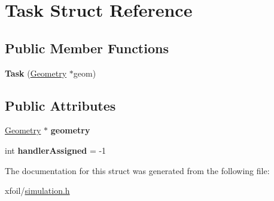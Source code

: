 \hypertarget{struct_task}{}\section{Task Struct Reference}
\label{struct_task}
\subsection*{Public Member Functions}
\begin{DoxyCompactItemize}
\item 
\hypertarget{struct_task_a065fcc943559671cefeb383652bc30fd}{}\label{struct_task_a065fcc943559671cefeb383652bc30fd} 
{\bfseries Task} (\hyperlink{class_geometry}{Geometry} $\ast$geom)
\end{DoxyCompactItemize}
\subsection*{Public Attributes}
\begin{DoxyCompactItemize}
\item 
\hypertarget{struct_task_a76af73b7a72c92cfc7ca31c88783f7df}{}\label{struct_task_a76af73b7a72c92cfc7ca31c88783f7df} 
\hyperlink{class_geometry}{Geometry} $\ast$ {\bfseries geometry}
\item 
\hypertarget{struct_task_a087808befc05fe735e07b51e2cb5eedf}{}\label{struct_task_a087808befc05fe735e07b51e2cb5eedf} 
int {\bfseries handler\+Assigned} = -\/1
\end{DoxyCompactItemize}


The documentation for this struct was generated from the following file\+:\begin{DoxyCompactItemize}
\item 
xfoil/\hyperlink{simulation_8h}{simulation.\+h}\end{DoxyCompactItemize}
